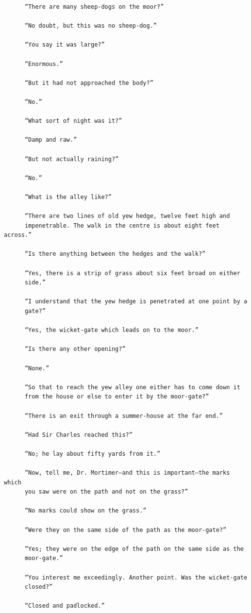 \documentclass{article}
\begin{document}
\begin{verbatim}
      “There are many sheep-dogs on the moor?”

      “No doubt, but this was no sheep-dog.”

      “You say it was large?”

      “Enormous.”

      “But it had not approached the body?”

      “No.”

      “What sort of night was it?”

      “Damp and raw.”

      “But not actually raining?”

      “No.”

      “What is the alley like?”

      “There are two lines of old yew hedge, twelve feet high and
      impenetrable. The walk in the centre is about eight feet across.”

      “Is there anything between the hedges and the walk?”

      “Yes, there is a strip of grass about six feet broad on either
      side.”

      “I understand that the yew hedge is penetrated at one point by a
      gate?”

      “Yes, the wicket-gate which leads on to the moor.”

      “Is there any other opening?”

      “None.”

      “So that to reach the yew alley one either has to come down it
      from the house or else to enter it by the moor-gate?”

      “There is an exit through a summer-house at the far end.”

      “Had Sir Charles reached this?”

      “No; he lay about fifty yards from it.”

      “Now, tell me, Dr. Mortimer—and this is important—the marks which
      you saw were on the path and not on the grass?”

      “No marks could show on the grass.”

      “Were they on the same side of the path as the moor-gate?”

      “Yes; they were on the edge of the path on the same side as the
      moor-gate.”

      “You interest me exceedingly. Another point. Was the wicket-gate
      closed?”

      “Closed and padlocked.”


\end{verbatim}
\end{document}

